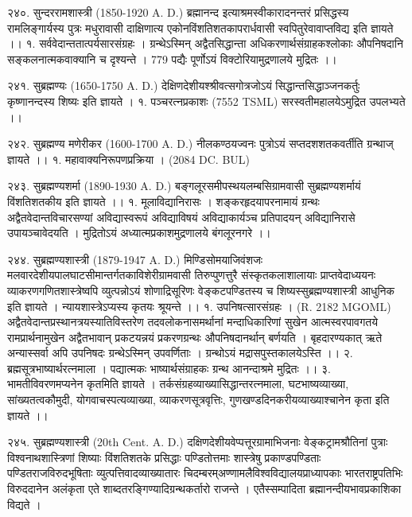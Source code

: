 २४०. सुन्दररामशास्त्री (1850-1920 A. D.)
ब्रह्मानन्द इत्याश्रमस्वीकारादनन्तरं प्रसिद्धस्य रामलिङ्गार्यस्य पुत्रः मधुरावासी दाक्षिणात्य एकोनविंशतिशतकापरार्धवासी स्वपितुरेवावाप्तविद्य इति ज्ञायते ।।
१. सर्ववेदान्ततात्पर्यसारसंग्रहः । ग्रन्थेऽस्मिन् अद्वैतसिद्धान्ता अधिकरणार्थसंग्राहकश्लोकाः औपनिषदानि सङ्कलनात्मकवाक्यानि च दृश्यन्ते । 779 पद्यैः पूर्णोऽयं विक्टोरियामुद्रणालये मुद्रितः ।।

२४१. सुब्रह्मण्यः (1650-1750 A. D.)
देक्षिणदेशीयश्श्रीवत्सगोत्रजोऽयं सिद्धान्तसिद्धाञ्जनकर्तुः कृष्णानन्दस्य शिष्यः इति ज्ञायते ।
१. पञ्चरत्नप्रकाशः (7552 TSML) सरस्वतीमहालयेऽमुद्रित उपलभ्यते ।।

२४२. सुब्रह्मण्य मणेरीकर (1600-1700 A. D.)
नीलकण्ठयज्वनः पुत्रोऽयं सप्तदशशतकवर्तीति ग्रन्थाज् ज्ञायते ।।
१. महावाक्यनिरूपणप्रक्रिया । (2084 DC. BUL)

२४३. सुब्रह्मण्यशर्मा (1890-1930 A. D.)
बङ्गलूरसमीपस्थयलम्बसिग्रामवासी सुब्रह्मण्यशर्मायं विंशतिशतकीय इति ज्ञायते ।।
१. मूलाविद्यानिरासः । शङ्करहृदयापरनामायं ग्रन्थः अद्वैतवेदान्तविचारसण्यां अविद्यास्वरूपं अविद्याविषयं अविद्याकार्यञ्च प्रतिपादयन् अविद्यानिरासे उपायञ्चावेदयति । मुद्रितोऽयं अध्यात्मप्रकाशमुद्रणालये बंगलूरनगरे ।।

२४४. सुब्रह्मण्यशास्त्री (1879-1947 A. D.)
मिण्डिसोमयाजिवंशजः मलवारदेशीयपालघाटसीमान्तर्गतकाविशेरीग्रामवासी तिरुप्पुणत्तुरै संस्कृतकलाशालायाः प्राप्तवेदाध्ययनः व्याकरणगणितशास्त्रेष्वपि व्युत्पन्नोऽयं शोणाद्रिसूरिणः वेङ्कटपण्डितस्य च शिष्यस्सुब्रह्मण्यशास्त्री आधुनिक इति ज्ञायते । न्यायशास्त्रेऽप्यस्य कृतयः श्रूयन्ते ।।
१. उपनिषत्सारसंग्रहः । (R. 2182 MGOML)
अद्वैतवेदान्तप्रस्थानत्रयस्यातिविस्तरेण तदवलोकनासमर्थानां मन्दाधिकारिणां सुखेन आत्मस्वरपावगतये रामप्रार्थनामुखेन अद्वैतभावान् प्रकटयन्नयं प्रकरणग्रन्थः औपनिषदानर्थान् बर्णयति । बृहदारण्यकात् ऋते अन्यास्सर्वा अपि उपनिषदः ग्रन्थेऽस्मिन् उपवर्णिताः । ग्रन्थोऽयं मद्रासपुस्तकालयेऽस्ति ।।
२. ब्रह्मसूत्रभाष्यार्थरत्नमाला । पद्यात्मकः भाष्यार्थसंग्राहकः ग्रन्थ आनन्दाश्रमे मुद्रितः ।।
३. भामतीविवरणमप्यनेन कृतमिति ज्ञायते ।
तर्कसंग्रहव्याख्यासिद्धान्तरत्नमाला, घटभाष्यव्याख्या, सांख्यतत्वकौमुदी, योगवाचस्पत्यव्याख्या, व्याकरणसूत्रवृत्तिः, गुणखण्डदिनकरीयव्याख्याश्चानेन कृता इति ज्ञायते ।।

२४५. सुब्रह्मण्यशास्त्री (20th Cent. A. D.)
दक्षिणदेशीयवेप्पत्तूरग्रामाभिजनाः वेङ्कट्रामश्रौतिनां पुत्राः विश्वनाथशास्त्रिणां शिष्याः विंशतिशतके प्रसिद्धाः पण्डितोत्तमाः शास्त्रेषु प्रकाण्डपण्डिताः पण्डितराजविरुदभूषिताः व्युत्पत्तिवादव्याख्यातारः चिदम्बरम्अण्णामलैविश्वविद्यालयप्राध्यापकाः भारतराष्ट्रपतिभिः विरुददानेन अलंकृता एते शाब्दतरङ्गिण्यादिग्रन्थकर्तारो राजन्ते । एतैस्सम्पादिता ब्रह्मानन्दीयभावप्रकाशिका विद्यते ।

